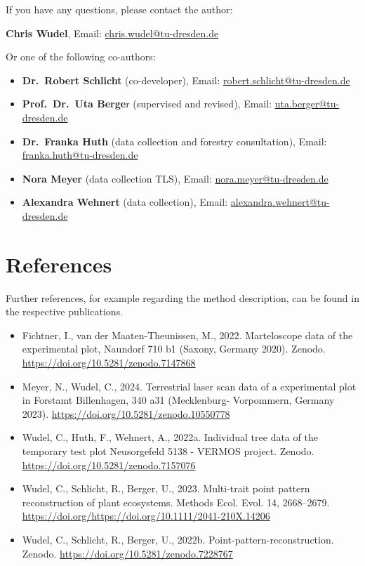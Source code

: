 \documentclass[
  letterpaper,
  DIV=11,
  numbers=noendperiod]{scrreprt}
\begin{document}
If you have any questions, please contact the author:

\textbf{Chris Wudel}, Email: \ul{chris.wudel@tu-dresden.de}

Or one of the following co-authors:

\begin{itemize}
\item
  \textbf{Dr.~Robert Schlicht} (co-developer), Email:
  \ul{robert.schlicht@tu-dresden.de}
\item
  \textbf{Prof.~Dr.~Uta Berge}r (supervised and revised), Email:
  \ul{uta.berger@tu-dresden.de}
\item
  \textbf{Dr.~Franka Huth} (data collection and forestry consultation),
  Email: \ul{franka.huth@tu-dresden.de}
\item
  \textbf{Nora Meyer} (data collection TLS), Email:
  \ul{nora.meyer@tu-dresden.de}
\item
  \textbf{Alexandra Wehnert} (data collection), Email:
  \ul{alexandra.wehnert@tu-dresden.de}
\end{itemize}


\chapter*{References}\label{references}


Further references, for example regarding the method description, can be
found in the respective publications.

\begin{itemize}
\item
  Fichtner, I., van der Maaten-Theunissen, M., 2022. Marteloscope data
  of the experimental plot, Naundorf 710 b1 (Saxony, Germany 2020).
  Zenodo. \url{https://doi.org/10.5281/zenodo.7147868}
\item
  Meyer, N., Wudel, C., 2024. Terrestrial laser scan data of a
  experimental plot in Forstamt Billenhagen, 340 a31 (Mecklenburg-
  Vorpommern, Germany 2023).
  \url{https://doi.org/10.5281/zenodo.10550778}
\item
  Wudel, C., Huth, F., Wehnert, A., 2022a. Individual tree data of the
  temporary test plot Neusorgefeld 5138 - VERMOS project. Zenodo.
  \url{https://doi.org/10.5281/zenodo.7157076}
\item
  Wudel, C., Schlicht, R., Berger, U., 2023. Multi-trait point pattern
  reconstruction of plant ecosystems. Methods Ecol. Evol. 14,
  2668--2679.
  \url{https://doi.org/https://doi.org/10.1111/2041-210X.14206}
\item
  Wudel, C., Schlicht, R., Berger, U., 2022b.
  Point-pattern-reconstruction. Zenodo.
  \url{https://doi.org/10.5281/zenodo.7228767}
\end{itemize}
\end{document}
